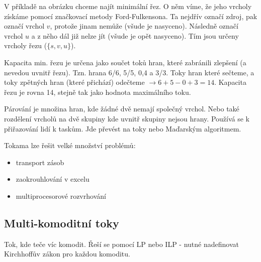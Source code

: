 V příkladě na obrázku chceme najít minimální řez. O něm víme, že jeho vrcholy získáme pomocí značkovací metody Ford-Fulkensona. Ta nejdřív označí zdroj, pak označí vrchol $v$, protože jinam nemůže (všude je nasyceno). Následně označí vrchol $u$ a z něho dál již nelze jít (všude je opět nasyceno). Tím jsou určeny vrcholy řezu ($\{s,v,u\}$).

Kapacita min. řezu je určena jako součet toků hran, které zabránili zlepšení (a nevedou uvnitř řezu). Tzn. hrana 6/6, 5/5, 0,4 a 3/3. Toky hran které  sečteme, a toky zpětných hran (které přichází) odečteme $\rightarrow 6 + 5 - 0 + 3 = 14$. Kapacita řezu je rovna 14, stejně tak jako hodnota maximálního toku.

Párování je množina hran, kde žádné dvě nemají společný vrchol. Nebo také rozdělení vrcholů na dvě skupiny kde uvnitř skupiny nejsou hrany. Používá se k přiřazování lidí k taskům. Jde převést na toky nebo Maďarským algoritmem.

Tokama lze řešit velké množství problémů:

\begin{itemize}[itemsep=0px]
\item transport zásob
\item zaokrouhlování v excelu
\item multiprocesorové rozvrhování
\end{itemize}

\subsection{Multi-komoditní toky}
Tok, kde teče víc komodit. Řeší se pomocí LP nebo ILP - nutné nadefinovat Kirchhoffův zákon pro každou komoditu. 